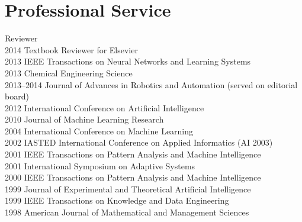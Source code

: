 \documentclass[12pt]{resume}
\begin{document}
\section{Professional Service}{Reviewer}
        {\\          
          2014 Textbook Reviewer for Elsevier\\
          2013 IEEE Transactions on Neural Networks and Learning Systems\\
          2013 Chemical Engineering Science\\
          2013--2014 Journal of Advances in Robotics and Automation (served on editorial board)\\
2012 International Conference on Artificial Intelligence\\
2010 Journal of Machine Learning Research\\
2004 International Conference on Machine Learning\\
2002 IASTED International Conference on Applied Informatics (AI 2003)\\
2001 IEEE Transactions on Pattern Analysis and Machine Intelligence\\
2001 International Symposium on Adaptive Systems\\
2000 IEEE Transactions on Pattern Analysis and Machine Intelligence \\ 
1999 Journal of Experimental and Theoretical Artificial Intelligence\\
1999 IEEE Transactions on Knowledge and Data Engineering\\
\rm
1998 American Journal of Mathematical and Management Sciences\\
}
\end{document}
